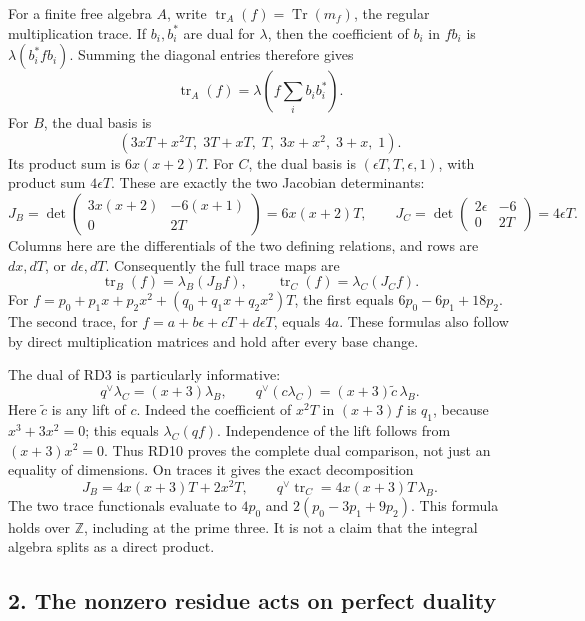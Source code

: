 \documentclass[
  10pt,
  a4paper,
]{article}
\begin{document}
For a finite free algebra \(A\), write
\(\operatorname{tr}_A(f)=\operatorname{Tr}(m_f)\), the regular
multiplication trace. If \(b_i,b_i^*\) are dual for \(\lambda\), then
the coefficient of \(b_i\) in \(fb_i\) is \(\lambda(b_i^*fb_i)\).
Summing the diagonal entries therefore gives \[
\operatorname{tr}_A(f)=\lambda\!\left(f\sum_i b_i b_i^*\right).
\tag{RD7}
\] For \(B\), the dual basis is \[
(3xT+x^2T,\;3T+xT,\;T,\;3x+x^2,\;3+x,\;1).
\] Its product sum is \(6x(x+2)T\). For \(C\), the dual basis is
\((\epsilon T,T,\epsilon,1)\), with product sum \(4\epsilon T\). These
are exactly the two Jacobian determinants: \[
J_B=\det\begin{pmatrix}3x(x+2)&-6(x+1)\\0&2T\end{pmatrix}
=6x(x+2)T,\qquad
J_C=\det\begin{pmatrix}2\epsilon&-6\\0&2T\end{pmatrix}
=4\epsilon T.
\tag{RD8}
\] Columns here are the differentials of the two defining relations, and
rows are \(dx,dT\), or \(d\epsilon,dT\). Consequently the full trace
maps are \[
\operatorname{tr}_B(f)=\lambda_B(J_Bf),\qquad
\operatorname{tr}_C(f)=\lambda_C(J_Cf).
\tag{RD9}
\] For \(f=p_0+p_1x+p_2x^2+(q_0+q_1x+q_2x^2)T\), the first equals
\(6p_0-6p_1+18p_2\). The second trace, for
\(f=a+b\epsilon+cT+d\epsilon T\), equals \(4a\). These formulas also
follow by direct multiplication matrices and hold after every base
change.

The dual of RD3 is particularly informative: \[
q^\vee\lambda_C=(x+3)\lambda_B,\qquad
q^\vee(c\lambda_C)=(x+3)\widetilde c\,\lambda_B.
\tag{RD10}
\] Here \(\widetilde c\) is any lift of \(c\). Indeed the coefficient of
\(x^2T\) in \((x+3)f\) is \(q_1\), because \(x^3+3x^2=0\); this equals
\(\lambda_C(qf)\). Independence of the lift follows from \((x+3)x^2=0\).
Thus RD10 proves the complete dual comparison, not just an equality of
dimensions. On traces it gives the exact decomposition \[
J_B=4x(x+3)T+2x^2T,\qquad
q^\vee\operatorname{tr}_C=4x(x+3)T\,\lambda_B.
\tag{RD11}
\] The two trace functionals evaluate to \(4p_0\) and
\(2(p_0-3p_1+9p_2)\). This formula holds over \(\mathbb Z\), including
at the prime three. It is not a claim that the integral algebra splits
as a direct product.

\subsection{2. The nonzero residue acts on perfect
duality}\label{the-nonzero-residue-acts-on-perfect-duality}
\end{document}
